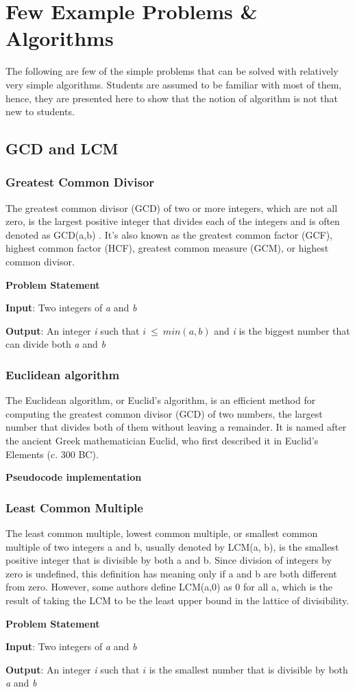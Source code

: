 \documentclass[12pt,a4paper]{book}
\begin{document}
\section{Few Example Problems \& Algorithms}
The following are few of the simple problems that can be solved with relatively very simple algorithms. Students are assumed to be familiar with most of them, hence, they are presented here to show that the notion of algorithm is not that new to students.
\subsection{GCD and LCM}
\subsubsection{Greatest Common Divisor}
The greatest common divisor (GCD) of two or more integers, which are not all zero, is the largest positive integer that divides each of the integers and is often denoted as GCD(a,b) . It's also known as the greatest common factor (GCF), highest common factor (HCF), greatest common measure (GCM), or highest common divisor.\par
\noindent\textbf{Problem Statement}
\par \textbf{Input}: Two integers of \textit{a} and \textit{b} \par
\textbf{Output}: An integer \textit{i} such that  $i\ \leq\ min(a, b)$  and \textit{i} is the biggest number that can divide both \textit{a} and \textit{b}
\subsubsection{Euclidean algorithm}
The Euclidean algorithm, or Euclid's algorithm, is an efficient method for computing the greatest common divisor (GCD) of two numbers, the largest number that divides both of them without leaving a remainder. It is named after the ancient Greek mathematician Euclid, who first described it in Euclid's Elements (c. 300 BC).\par
\noindent \textbf {Pseudocode implementation}

\subsubsection{Least Common Multiple}
The least common multiple, lowest common multiple, or smallest common multiple of two integers a and b, usually denoted by LCM(a, b), is the smallest positive integer that is divisible by both a and b. Since division of integers by zero is undefined, this definition has meaning only if a and b are both different from zero. However, some authors define LCM(a,0) as 0 for all a, which is the result of taking the LCM to be the least upper bound in the lattice of divisibility.\par
\noindent\textbf{Problem Statement}\par
\textbf{Input}: Two integers of \textit{a} and \textit{b} \par 
\textbf{Output}: An integer \textit{i} such that  $i$ is the smallest number that is divisible by both \textit{a} and \textit{b}
\end{document}
